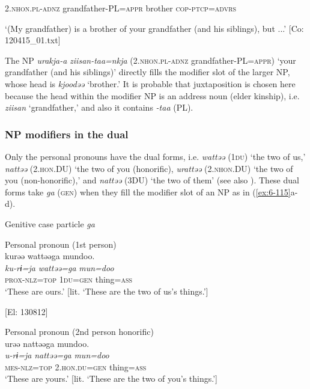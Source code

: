\begin{table}
    2.\textsc{nhon}.\textsc{pl}-\textsc{adnz}  grandfather-PL=\textsc{appr}  brother  \textsc{cop}-\textsc{ptcp}=\textsc{advrs}

\glt    ‘(My grandfather) is a brother of your grandfather (and his siblings), but ...’ [Co: 120415\_01.txt]
\z

The NP \textit{urakja-a} \textit{ziisan-taa=nkja} (2.\textsc{nhon}.\textsc{pl}-\textsc{adnz} grandfather-PL=\textsc{appr}) ‘your grandfather (and his siblings)’ directly fills the modifier slot of the larger NP, whose head is \textit{kjoodəə} ‘brother.’ It is probable that juxtaposition is chosen here because the head within the modifier NP is an address noun (elder kinship), i.e. \textit{ziisan} ‘grandfather,’ and also it contains \textit{-taa} (PL).

\subsubsection{NP modifiers in the dual}

Only the personal pronouns have the dual forms, i.e. \textit{wattəə} (1\textsc{du}) ‘the two of us,’ \textit{nattəə} (2.\textsc{hon}.DU) ‘the two of you (honorific), \textit{urattəə} (2.\textsc{nhon}.DU) ‘the two of you (non-honorific),’ and \textit{nattəə} (3DU) ‘the two of them’ (see also ). These dual forms take \textit{ga} (\textsc{gen}) when they fill the modifier slot of an NP as in (\ref{ex:6-115}a-d).

\ea\label{ex:6-115}
  Genitive case particle \textit{ga}

 \ea Personal pronoun (1st person)\\
{\TM}
\glll  kurəə  wattəəga  mundoo.\\
\textit{ku-rɨ=ja}  \textit{wattəə=ga}  \textit{mun=doo}\\
\textsc{prox}-\textsc{nlz}=\textsc{top}  1\textsc{du}=\textsc{gen}  thing=\textsc{ass}\\
\glt ‘These are ours.’ [lit. ‘These are the two of us’s things.’]

      [El: 130812]

\ex Personal pronoun (2nd person honorific)\\
{\TM}
\glll  urəə  nattəəga  mundoo.\\
\textit{u-rɨ=ja}  \textit{nattəə=ga}  \textit{mun=doo}\\
\textsc{mes}-\textsc{nlz}=\textsc{top}  2.\textsc{hon}.\textsc{du}=\textsc{gen}  thing=\textsc{ass}\\
\glt ‘These are yours.’ [lit. ‘These are the two of you’s things.’]


\end{table}
